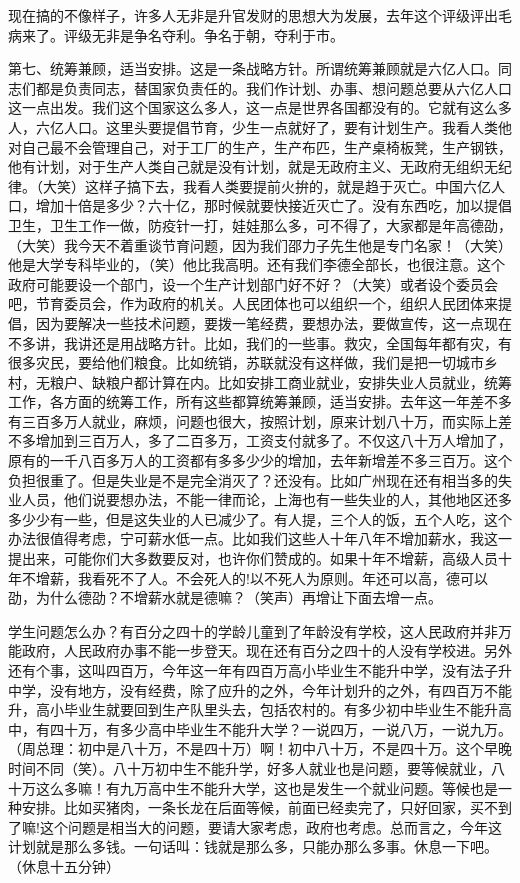 现在搞的不像样子，许多人无非是升官发财的思想大为发展，去年这个评级评出毛病来了。评级无非是争名夺利。争名于朝，夺利于市。

第七、统筹兼顾，适当安排。这是一条战略方针。所谓统筹兼顾就是六亿人口。同志们都是负责同志，替国家负责任的。我们作计划、办事、想问题总要从六亿人口这一点出发。我们这个国家这么多人，这一点是世界各国都没有的。它就有这么多人，六亿人口。这里头要提倡节育，少生一点就好了，要有计划生产。我看人类他对自己最不会管理自己，对于工厂的生产，生产布匹，生产桌椅板凳，生产钢铁，他有计划，对于生产人类自己就是没有计划，就是无政府主义、无政府无组织无纪律。（大笑）这样子搞下去，我看人类要提前火拚的，就是趋于灭亡。中国六亿人口，增加十倍是多少？六十亿，那时候就要快接近灭亡了。没有东西吃，加以提倡卫生，卫生工作一做，防疫针一打，娃娃那么多，可不得了，大家都是年高德劭，（大笑）我今天不着重谈节育问题，因为我们邵力子先生他是专门名家！（大笑）他是大学专科毕业的，（笑）他比我高明。还有我们李德全部长，也很注意。这个政府可能要设一个部门，设一个生产计划部门好不好？（大笑）或者设个委员会吧，节育委员会，作为政府的机关。人民团体也可以组织一个，组织人民团体来提倡，因为要解决一些技术问题，要拨一笔经费，要想办法，要做宣传，这一点现在不多讲，我讲还是用战略方针。比如，我们的一些事。救灾，全国每年都有灾，有很多灾民，要给他们粮食。比如统销，苏联就没有这样做，我们是把一切城市乡村，无粮户、缺粮户都计算在内。比如安排工商业就业，安排失业人员就业，统筹工作，各方面的统筹工作，所有这些都算统筹兼顾，适当安排。去年这一年差不多有三百多万人就业，麻烦，问题也很大，按照计划，原来计划八十万，而实际上差不多增加到三百万人，多了二百多万，工资支付就多了。不仅这八十万人增加了，原有的一千八百多万人的工资都有多多少少的增加，去年新增差不多三百万。这个负担很重了。但是失业是不是完全消灭了？还没有。比如广州现在还有相当多的失业人员，他们说要想办法，不能一律而论，上海也有一些失业的人，其他地区还多多少少有一些，但是这失业的人已减少了。有人提，三个人的饭，五个人吃，这个办法很值得考虑，宁可薪水低一点。比如我们这些人十年八年不增加薪水，我这一提出来，可能你们大多数要反对，也许你们赞成的。如果十年不增薪，高级人员十年不增薪，我看死不了人。不会死人的!以不死人为原则。年还可以高，德可以劭，为什么德劭？不增薪水就是德嘛？（笑声）再增让下面去增一点。

学生问题怎么办？有百分之四十的学龄儿童到了年龄没有学校，这人民政府并非万能政府，人民政府办事不能一步登天。现在还有百分之四十的人没有学校进。另外还有个事，这叫四百万，今年这一年有四百万高小毕业生不能升中学，没有法子升中学，没有地方，没有经费，除了应升的之外，今年计划升的之外，有四百万不能升，高小毕业生就要回到生产队里头去，包括农村的。有多少初中毕业生不能升高中，有四十万，有多少高中毕业生不能升大学？一说四万，一说八万，一说九万。（周总理：初中是八十万，不是四十万）啊！初中八十万，不是四十万。这个早晚时间不同（笑）。八十万初中生不能升学，好多人就业也是问题，要等候就业，八十万这么多嘛！有九万高中生不能升大学，这也是发生一个就业问题。等候也是一种安排。比如买猪肉，一条长龙在后面等候，前面已经卖完了，只好回家，买不到了嘛!这个问题是相当大的问题，要请大家考虑，政府也考虑。总而言之，今年这计划就是那么多钱。一句话叫：钱就是那么多，只能办那么多事。休息一下吧。（休息十五分钟）

